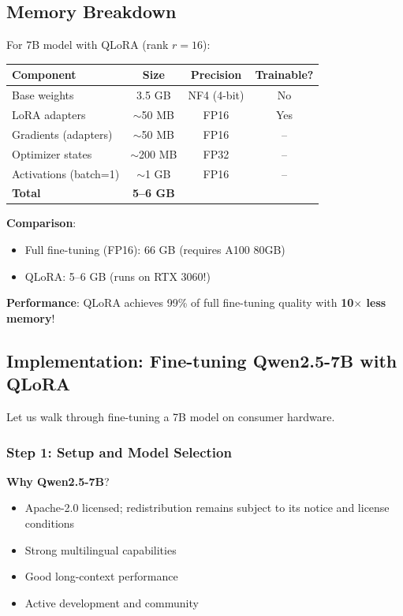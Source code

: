 \documentclass{article}
\begin{document}
\subsection{Memory Breakdown}

For 7B model with QLoRA (rank $r=16$):

\begin{center}
\begin{tabular}{lccc}
\toprule
\textbf{Component} & \textbf{Size} & \textbf{Precision} & \textbf{Trainable?} \\
\midrule
Base weights & 3.5 GB & NF4 (4-bit) & No \\
LoRA adapters & $\sim$50 MB & FP16 & Yes \\
Gradients (adapters) & $\sim$50 MB & FP16 & -- \\
Optimizer states & $\sim$200 MB & FP32 & -- \\
Activations (batch=1) & $\sim$1 GB & FP16 & -- \\
\midrule
\textbf{Total} & \textbf{5--6 GB} & & \\
\bottomrule
\end{tabular}
\end{center}

\textbf{Comparison}:
\begin{itemize}
\item Full fine-tuning (FP16): 66 GB (requires A100 80GB)
\item QLoRA: 5--6 GB (runs on RTX 3060!)
\end{itemize}

\textbf{Performance}: QLoRA achieves 99\% of full fine-tuning quality with \textbf{10$\times$ less memory}!

\subsection{Implementation: Fine-tuning Qwen2.5-7B with QLoRA}

Let us walk through fine-tuning a 7B model on consumer hardware.

\subsubsection{Step 1: Setup and Model Selection}


\textbf{Why Qwen2.5-7B}?
\begin{itemize}
\item Apache-2.0 licensed; redistribution remains subject to its notice and license conditions
\item Strong multilingual capabilities
\item Good long-context performance
\item Active development and community
\end{itemize}
\end{document}
